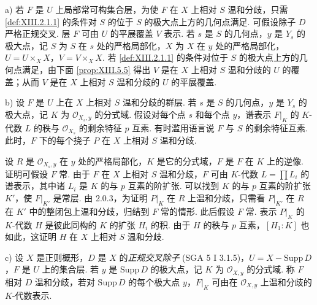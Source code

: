 \begin{remark}\label{rem:XIII.2.3}
a) 若 $F$ 是 $U$ 上局部常可构集合层，为使 $F$ 在 $X$ 上相对 $S$ 温和分歧，只需 \ref{def:XIII.2.1.1} 的条件对 $S$ 的位于 $S$ 的极大点上方的几何点满足. 可假设除子 $D$ 严格正规交叉. 层 $F$ 可由 $U$ 的平展覆盖 $V$ 表示. 若 $s$ 是 $S$ 的几何点，$y$ 是 $Y_s$ 的极大点，记 $S$ 为 $S$ 在 $s$ 处的严格局部化，$X$ 为 $X$ 在 $y$ 处的严格局部化，$U = U \times_X X$，$V = V \times_X X$. 若 \ref{def:XIII.2.1.1} 的条件对位于 $S$ 的极大点上方的几何点满足，由下面 \ref{prop:XIII.5.5} 得出 $V$ 是在 $X$ 上相对 $S$ 温和分歧的 $U$ 的覆盖；从而 $V$ 是在 $X$ 上相对 $S$ 温和分歧的 $U$ 的平展覆盖.

b) 设 $F$ 是 $U$ 上在 $X$ 上相对 $S$ 温和分歧的群层. 若 $s$ 是 $S$ 的几何点，$y$ 是 $Y_s$ 的极大点，记 $K$ 为 $\mathcal{O}_{X_s, y}$ 的分式域. 假设对每个点 $s$ 和每个点 $y$，谱表示 $F|_K$ 的 $K$-代数 $L$ 的秩与 $\mathcal{O}_{X_s}$ 的剩余特征 $p$ 互素. 有时滥用语言说 $F$ 与 $S$ 的剩余特征互素. 此时，$F$ 下的每个挠子 $P$ 在 $X$ 上相对 $S$ 温和分歧.

设 $R$ 是 $\mathcal{O}_{X_s, y}$ 在 $y$ 处的严格局部化，$K$ 是它的分式域，$F$ 是 $F$ 在 $K$ 上的逆像. 证明可假设 $F$ 常. 由于 $F$ 在 $X$ 上相对 $S$ 温和分歧，$F$ 可由 $K$-代数 $L = \prod L_i$ 的谱表示，其中诸 $L_i$ 是 $K$ 的与 $p$ 互素的阶扩张. 可以找到 $K$ 的与 $p$ 互素的阶扩张 $K'$，使 $F|_{K'}$ 是常层. 由 2.0.3，为证明 $P|_K$ 在 $R$ 上温和分歧，只需看 $P|_{K'}$ 在 $R$ 在 $K'$ 中的整闭包上温和分歧，归结到 $F$ 常的情形. 此后假设 $F$ 常. 表示 $P|_K$ 的 $K$-代数 $H$ 是彼此同构的 $K$ 的扩张 $H_i$ 的积. 由于 $H$ 的秩与 $p$ 互素，$[H_1 : K]$ 也如此，这证明 $H$ 在 $X$ 上相对 $S$ 温和分歧.

c) 设 $X$ 是正则概形，$D$ 是 $X$ 的\emph{正规交叉除子} (SGA 5 I 3.1.5)，$U = X - \mathrm{Supp}\, D$，$F$ 是 $U$ 上的集合层. 若 $y$ 是 $\mathrm{Supp}\, D$ 的极大点，记 $K$ 为 $\mathcal{O}_{X, y}$ 的分式域. 称 $F$ 相对 $D$ 温和分歧，若对 $\mathrm{Supp}\, D$ 的每个极大点 $y$，$F|_K$ 可由在 $\mathcal{O}_{X, y}$ 上温和分歧的 $K$-代数表示.
\end{remark}


